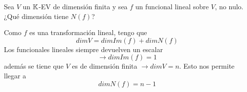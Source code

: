 \item Sea $V$ un $\mathbb{K}$-EV de dimensión finita y sea $f$ un funcional lineal sobre $V$, no nulo.¿Qué dimensión tiene $N(f)$?
    \begin{mdframed}[style=s]
        Como $f$ es una transformación lineal, tengo que \[dimV=dimIm(f)+dim N(f)\]Los funcionales lineales siempre devuelven un escalar \[\to dimIm(f)=1\]además se tiene que $V$ es de dimensión finita $\to dimV=n$. Esto nos permite llegar a \[dimN(f)=n-1\] 
    \end{mdframed}